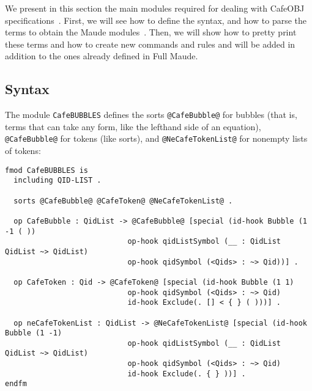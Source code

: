 
We present in this section the main modules required for dealing with CafeOBJ
specifications~\cite{cafe-report}. First, we will see how to define the syntax,
and how to parse the terms to obtain the Maude modules~\cite{maude-book}. Then,
we will show how to pretty print these terms and how to create new commands and
rules and will be added in addition to the ones already defined in Full Maude.

{\codesize
\begin{comment}
******************************************************
***predefined modules
******************************************************
***for HS

fmod COMPONENTS is
  sorts AComp OComp State .
  subsort AComp OComp < State .

  op empty-state : -> State .
  op __ : State State -> State [assoc comm id: empty-state format(o nt o)] .
endfm

*****************************************************
***for translation
*****************************************************
\end{comment}
}

\subsection{Syntax\label{subsec:syntax}}

The module \verb"CafeBUBBLES" defines the sorts \verb"@CafeBubble@" for bubbles (that is,
terms that can take any form, like the lefthand side of an equation), \verb"@CafeBubble@"
for tokens (like sorts), and \verb"@NeCafeTokenList@" for nonempty lists of tokens:

{\codesize
\begin{verbatim}
fmod CafeBUBBLES is
  including QID-LIST .

  sorts @CafeBubble@ @CafeToken@ @NeCafeTokenList@ .

  op CafeBubble : QidList -> @CafeBubble@ [special (id-hook Bubble (1 -1 ( ))
                            op-hook qidListSymbol (__ : QidList QidList ~> QidList)
                            op-hook qidSymbol (<Qids> : ~> Qid))] .

  op CafeToken : Qid -> @CafeToken@ [special (id-hook Bubble (1 1)
                            op-hook qidSymbol (<Qids> : ~> Qid)
                            id-hook Exclude(. [] < { } ( )))] .

  op neCafeTokenList : QidList -> @NeCafeTokenList@ [special (id-hook Bubble (1 -1)
                            op-hook qidListSymbol (__ : QidList QidList ~> QidList)
                            op-hook qidSymbol (<Qids> : ~> Qid)
                            id-hook Exclude(. { } ))] .
endfm
\end{verbatim}
}

